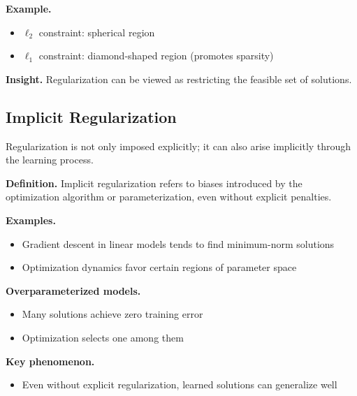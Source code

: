 \medskip

\noindent
\textbf{Example.}
\begin{itemize}
    \item $\ell_2$ constraint: spherical region
    \item $\ell_1$ constraint: diamond-shaped region (promotes sparsity)
\end{itemize}

\medskip

\noindent
\textbf{Insight.}  
Regularization can be viewed as restricting the feasible set of solutions.

\subsection{Implicit Regularization}

Regularization is not only imposed explicitly; it can also arise implicitly through the learning process.

\medskip

\noindent
\textbf{Definition.}  
Implicit regularization refers to biases introduced by the optimization algorithm or parameterization, even without explicit penalties.

\medskip

\noindent
\textbf{Examples.}

\begin{itemize}
    \item Gradient descent in linear models tends to find minimum-norm solutions
    \item Optimization dynamics favor certain regions of parameter space
\end{itemize}

\medskip

\noindent
\textbf{Overparameterized models.}
\begin{itemize}
    \item Many solutions achieve zero training error
    \item Optimization selects one among them
\end{itemize}

\medskip

\noindent
\textbf{Key phenomenon.}
\begin{itemize}
    \item Even without explicit regularization, learned solutions can generalize well
\end{itemize}

\medskip

